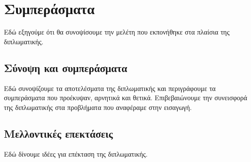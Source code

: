 \chapter{Συμπεράσματα}
\label{chap_last}

Εδώ εξηγούμε ότι θα συνοψίσουμε την μελέτη που εκπονήθηκε στα πλαίσια της διπλωματικής.

\section{Σύνοψη και συμπεράσματα}

Εδώ συνοψίζουμε τα αποτελέσματα της διπλωματικής και περιγράφουμε τα συμπεράσματα που προέκυψαν, αρνητικά και θετικά. Επιβεβαιώνουμε την συνεισφορά της διπλωματικής στα προβλήματα που αναφέραμε στην εισαγωγή.

\section{Μελλοντικές επεκτάσεις}

Εδώ δίνουμε ιδέες για επέκταση της διπλωματικής.
